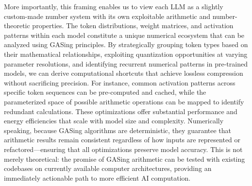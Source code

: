 More importantly, this framing enables us to view each LLM as a slightly custom-made number system with its own exploitable arithmetic and number-theoretic properties. The token distributions, weight matrices, and activation patterns within each model constitute a unique numerical ecosystem that can be analyzed using GASing principles. By strategically grouping token types based on their mathematical relationships, exploiting quantization opportunities at varying parameter resolutions, and identifying recurrent numerical patterns in pre-trained models, we can derive computational shortcuts that achieve lossless compression without sacrificing precision. For instance, common activation patterns across specific token sequences can be pre-computed and cached, while the parameterized space of possible arithmetic operations can be mapped to identify redundant calculations. These optimizations offer substantial performance and energy efficiencies that scale with model size and complexity. Numerically speaking, because GASing algorithms are deterministic, they guarantee that arithmetic results remain consistent regardless of how inputs are represented or refactored—ensuring that all optimizations preserve model accuracy. This is not merely theoretical: the promise of GASing arithmetic can be tested with existing codebases on currently available computer architectures, providing an immediately actionable path to more efficient AI computation.
